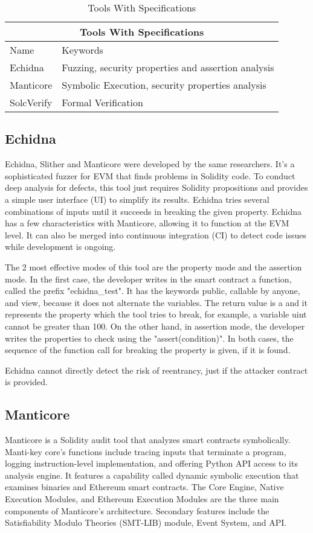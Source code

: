 \documentclass[a4paper,sigconf, language=french,
language=german, language=spanish, language=english]{acmart}
\begin{document}
\begin{table*}
  \caption{Tools With Specifications}
  \label{TollsWithSpec}
  \begin{tabular}{ |p{5cm}|p{5cm}|  }
    \hline
    \multicolumn{2}{|c|}{Tools With Specifications }\\
    \hline
    Name & Keywords \\
    \hline 
    Echidna  & Fuzzing, security properties and assertion analysis\\
    \hline
    Manticore  & Symbolic Execution, security properties analysis \\
    \hline
    SolcVerify & Formal Verification \\
    \hline
  \end{tabular}
\end{table*}
\subsection{Echidna} 
Echidna, Slither and Manticore were developed by the same researchers.
It's a sophisticated fuzzer for EVM that finds problems in Solidity code.
To conduct deep analysis for defects, this tool just requires Solidity propositions and provides a simple user interface (UI) to simplify its results.
Echidna tries several combinations of inputs until it succeeds in breaking the given property.
Echidna has a few characteristics with Manticore, allowing it to function at the EVM level.
It can also be merged into continuous integration (CI) to detect code issues while development is ongoing. 

The 2 most effective modes of this tool are the property mode and the assertion mode. In the first case, the developer writes in the smart contract a function, called the prefix "echidna\_test". It has the keywords public, callable by anyone, and view, because it does not alternate the variables. The return value is a  and it represents the property which the tool tries to break, for example, a variable uint cannot be greater than 100. On the other hand, in assertion mode, the developer writes the properties to check using the "assert(condition)". In both cases, the sequence of the function call for breaking the property is given, if it is found.

Echidna cannot directly detect the risk of reentrancy, just if the attacker contract is provided.

\subsection{Manticore} 
Manticore is a Solidity audit tool that analyzes smart contracts symbolically.
Manti-key core's functions include tracing inputs that terminate a program, logging instruction-level implementation, and offering Python API access to its analysis engine.
It features a capability called dynamic symbolic execution that examines binaries and Ethereum smart contracts.
The Core Engine, Native Execution Modules, and Ethereum Execution Modules are the three main components of Manticore's architecture.
Secondary features include the Satisfiability Modulo Theories (SMT-LIB) module, Event System, and API. 
\end{document}
